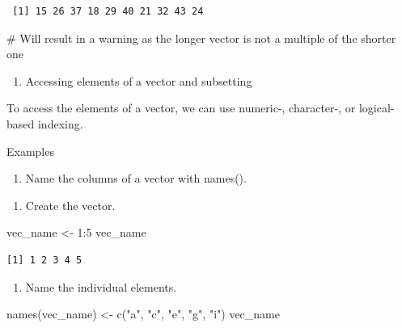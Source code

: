 \documentclass[
  letterpaper,
  DIV=11,
  numbers=noendperiod]{scrreprt}
\newenvironment{Shaded}{\begin{snugshade}}{\end{snugshade}}
\newcommand{\CommentTok}[1]{\textcolor[rgb]{0.37,0.37,0.37}{#1}}
\newcommand{\DecValTok}[1]{\textcolor[rgb]{0.68,0.00,0.00}{#1}}
\newcommand{\FunctionTok}[1]{\textcolor[rgb]{0.28,0.35,0.67}{#1}}
\newcommand{\NormalTok}[1]{\textcolor[rgb]{0.00,0.23,0.31}{#1}}
\newcommand{\OtherTok}[1]{\textcolor[rgb]{0.00,0.23,0.31}{#1}}
\newcommand{\SpecialCharTok}[1]{\textcolor[rgb]{0.37,0.37,0.37}{#1}}
\newcommand{\StringTok}[1]{\textcolor[rgb]{0.13,0.47,0.30}{#1}}
\providecommand{\tightlist}{%
  \setlength{\itemsep}{0pt}\setlength{\parskip}{0pt}}\usepackage{longtable,booktabs,array}
\begin{document}
\begin{verbatim}
 [1] 15 26 37 18 29 40 21 32 43 24
\end{verbatim}

\begin{Shaded}
\begin{Highlighting}[]
\CommentTok{\# Will result in a warning as the longer vector is not a multiple of the shorter one}
\end{Highlighting}
\end{Shaded}

\begin{enumerate}
\def\labelenumi{\Alph{enumi})}
\setcounter{enumi}{3}
\tightlist
\item
  Accessing elements of a vector and subsetting
\end{enumerate}

To access the elements of a vector, we can use numeric-, character-, or
logical-based indexing.

Examples

\begin{enumerate}
\def\labelenumi{\arabic{enumi}.}
\tightlist
\item
  Name the columns of a vector with names().
\end{enumerate}

\begin{enumerate}
\def\labelenumi{\alph{enumi})}
\tightlist
\item
  Create the vector.
\end{enumerate}

\begin{Shaded}
\begin{Highlighting}[]
\NormalTok{vec\_name }\OtherTok{\textless{}{-}} \DecValTok{1}\SpecialCharTok{:}\DecValTok{5}
\NormalTok{vec\_name}
\end{Highlighting}
\end{Shaded}

\begin{verbatim}
[1] 1 2 3 4 5
\end{verbatim}

\begin{enumerate}
\def\labelenumi{\alph{enumi})}
\setcounter{enumi}{1}
\tightlist
\item
  Name the individual elements.
\end{enumerate}

\begin{Shaded}
\begin{Highlighting}[]
\FunctionTok{names}\NormalTok{(vec\_name) }\OtherTok{\textless{}{-}} \FunctionTok{c}\NormalTok{(}\StringTok{"a"}\NormalTok{, }\StringTok{"c"}\NormalTok{, }\StringTok{"e"}\NormalTok{, }\StringTok{"g"}\NormalTok{, }\StringTok{"i"}\NormalTok{)}
\NormalTok{vec\_name}
\end{Highlighting}
\end{Shaded}
\end{document}
